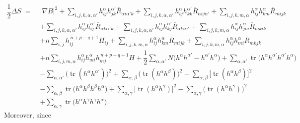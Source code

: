 \documentclass[leqno,11pt]{amsart}
\theoremstyle{plain}
\theoremstyle{definition}
\numberwithin{equation}{section}
\begin{document}
\begin{equation}\label{eq:DeltaS}
\begin{aligned}
\dfrac{1}{2}\Delta S \;=\;& |\nabla B|^2
  + \sum_{i,j,k,\alpha,\alpha'} h_{ij}^{\alpha}h_{jk}^{\alpha'}\overline{R}_{\alpha i \alpha' k}
  + \sum_{i,j,k,\alpha,\alpha'} h_{ij}^{\alpha}h_{kk}^{\alpha'}\overline{R}_{\alpha ij \alpha'}
  + \sum_{i,j,k,m,\alpha} h_{ij}^{\alpha}h_{km}^{\alpha}\overline{R}_{mijk} \\
&+ \sum_{i,j,k,\alpha,\alpha'} h_{ij}^{\alpha}h_{ij}^{\alpha'}\overline{R}_{\alpha k \alpha' k}
  + \sum_{i,j,k,\alpha,\alpha'} h_{ij}^{\alpha}h_{kj}^{\alpha'}\overline{R}_{\alpha ki \alpha'}
  + \sum_{i,j,k,m,\alpha} h_{ij}^{\alpha}h_{jm}^{\alpha}\overline{R}_{mkik} \\
&+ n\sum_{i,j} h_{ij}^{\,n+p-q+1}H_{ij}
  + \sum_{i,j,k,m,\alpha} h_{ij}^{\alpha}h_{km}^{\alpha}\overline{R}_{mijk}
  + \sum_{i,j,k,m,\alpha} h_{ij}^{\alpha}h_{mi}^{\alpha}\overline{R}_{mkjk} \\
&+ n\sum_{i,j,m,\alpha} h_{ij}^{\alpha}h_{mi}^{\alpha}h_{mj}^{\,n+p-q+1}H
  + \dfrac{1}{2}\sum_{\alpha,\alpha'} N\!\big(h^{\alpha}h^{\alpha'}-h^{\alpha'}h^{\alpha}\big)
  + \sum_{\alpha,\alpha'} \operatorname{tr}\!\big(h^{\alpha}h^{\alpha'}h^{\alpha'}h^{\alpha}\big) \\
&- \sum_{\alpha,\alpha'} \big(\operatorname{tr}(h^{\alpha}h^{\alpha'})\big)^2
  + \sum_{\alpha,\beta} \big(\operatorname{tr}(h^{\alpha}h^{\beta})\big)^2
  - \sum_{\alpha,\beta} \big[\operatorname{tr}(h^{\alpha}h^{\beta})\big]^2 \\
&- \sum_{\alpha,\beta} \operatorname{tr}\!\big(h^{\alpha}h^{\beta}h^{\beta}h^{\alpha}\big)
  + \sum_{\alpha,\gamma} \big[\operatorname{tr}(h^{\alpha}h^{\gamma})\big]^2
  - \sum_{\alpha,\gamma} \big(\operatorname{tr}(h^{\alpha}h^{\gamma})\big)^2 \\
&+ \sum_{\alpha,\gamma} \operatorname{tr}\!\big(h^{\alpha}h^{\gamma}h^{\gamma}h^{\alpha}\big)\,.
\end{aligned}
\end{equation}
Moreover, since 
\end{document}
